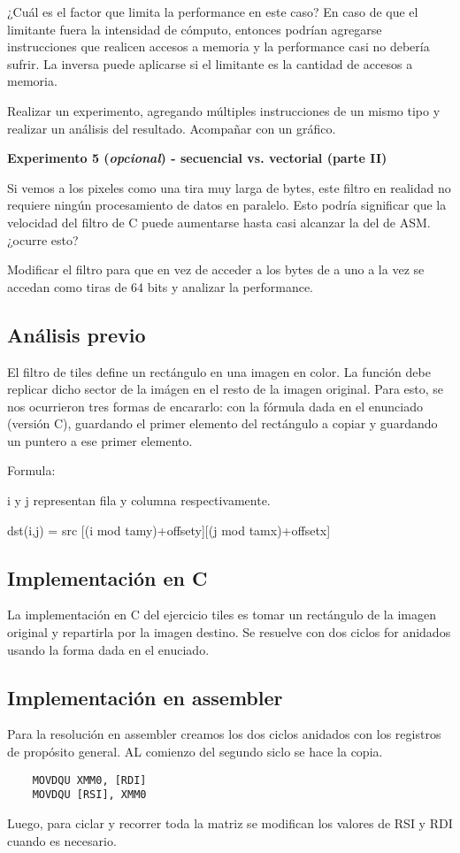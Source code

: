 	¿Cuál es el factor que limita la performance en este caso? En caso de que el limitante
	fuera la intensidad de cómputo, entonces podrían agregarse instrucciones que realicen
	accesos a memoria y la performance casi no debería sufrir. La inversa puede aplicarse
	si el limitante es la cantidad de accesos a memoria.
	
	Realizar un experimento, agregando múltiples instrucciones de un mismo tipo y realizar un análisis
	del resultado. Acompañar con un gráfico.

\vspace*{0.3cm} \noindent
\textbf{Experimento 5 (\textit{opcional}) - secuencial vs. vectorial (parte II)}

	Si vemos a los pixeles como una tira muy larga de bytes, este filtro en
	realidad no requiere ningún procesamiento de datos en paralelo. Esto podría
	significar que la velocidad del filtro de C puede aumentarse hasta casi
	alcanzar la del de ASM. ¿ocurre esto?
	
	Modificar el filtro para que en vez de acceder a los bytes de a uno a la vez
	se accedan como tiras de 64 bits y analizar la performance.
	
\newpage

\subsection{An\'alisis previo}
El filtro de tiles define un rect\'angulo en una imagen en color. La funci\'on debe replicar dicho sector de la im\'agen en el resto de la imagen original.
Para esto, se nos ocurrieron tres formas de encararlo: con la f\'ormula dada en el enunciado (versi\'on C), guardando el primer elemento del rect\'angulo a copiar y guardando un puntero a ese primer elemento.

Formula:

i y j representan fila y columna respectivamente.

dst(i,j) = src [(i mod tamy)+offsety][(j mod tamx)+offsetx]

\subsection{Implementaci\'on en C}

La implementaci\'on en C del ejercicio tiles es tomar un rect\'angulo de la imagen original y repartirla por la imagen destino. Se resuelve con dos ciclos for anidados usando la forma dada en el enuciado.

\subsection{Implementaci\'on en assembler}
Para la resoluci\'on en assembler creamos los dos ciclos anidados con los registros de prop\'osito general. AL comienzo del segundo siclo se hace la copia.
\begin{codesnippet}
\begin{verbatim}
	MOVDQU XMM0, [RDI]
	MOVDQU [RSI], XMM0
\end{verbatim}
\end{codesnippet}
Luego, para ciclar y recorrer toda la matriz se modifican los valores de RSI y RDI cuando es necesario.
